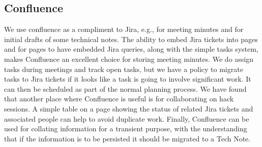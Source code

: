 \subsection{Confluence}
We use confluence  as a compliment to Jira, e.g., for meeting minutes and for initial drafts of some technical notes.
The ability to embed Jira tickets into pages and for pages to have embedded Jira queries, along with the simple tasks system, makes Confluence an excellent choice for storing meeting minutes.
We do assign tasks during meetings and track open tasks, but we have a policy to migrate tasks to Jira tickets if it looks like a task is going to involve significant work.
It can then be scheduled as part of the normal planning process.
We have found that another place where Confluence is useful is for collaborating on hack sessions.
A simple table on a page showing the status of related Jira tickets and associated people can help to avoid duplicate work.
Finally, Confluence can be used for collating information for a transient purpose, with the understanding that if the information is to be persisted it should be migrated to a Tech Note.
